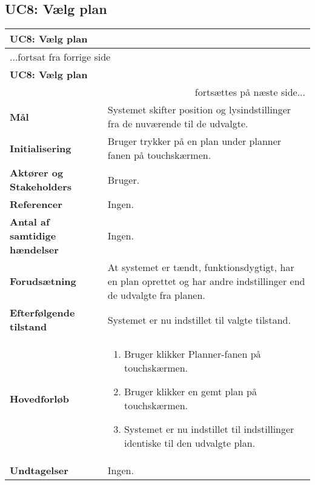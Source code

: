 \subsection{UC8: Vælg plan}

\begin{center} \centering
	\begin{longtable}{|p{6cm}|p{8cm}|}
	\hline
		\multicolumn{2}{|l|}{\textbf{UC8: Vælg plan}} \\\hline
		\endfirsthead
		
		\multicolumn{2}{l}{...fortsat fra forrige side} \\ \hline 
		\multicolumn{2}{|l|}{\textbf{UC8: Vælg plan}} \\\hline
		\endhead		

        \multicolumn{2}{r}{fortsættes på næste side...} \\
        \endfoot
        \endlastfoot
        
        \textbf{Mål}								
            & Systemet skifter position og lysindstillinger fra de nuværende til de udvalgte.
        \\ \hline
        \textbf{Initialisering}					
            & Bruger trykker på en plan under planner fanen på touchskærmen.
        \\ \hline
        \textbf{Aktører og Stakeholders}			
            & Bruger.
        \\ \hline
        \textbf{Referencer}						
            & Ingen.
        \\ \hline
        \textbf{Antal af samtidige hændelser}	
            & Ingen.
        \\ \hline
        \textbf{Forudsætning}					
            & At systemet er tændt, funktionsdygtigt, har en plan oprettet og har andre indstillinger end de udvalgte fra planen.
        \\ \hline
        \textbf{Efterfølgende tilstand}			
            & Systemet er nu indstillet til valgte tilstand.
        \\ \hline
        \textbf{Hovedforløb}						
            &
            \begin{enumerate}
                \item Bruger klikker Planner-fanen på touchskærmen.
                \item Bruger klikker en gemt plan på touchskærmen.
                \item Systemet er nu indstillet til indstillinger identiske til den udvalgte plan.
            \end{enumerate}
        \\ \hline
        \textbf{Undtagelser}						
            & Ingen.
        \\ \hline
	\end{longtable}
	\label{UC9} 
\end{center}